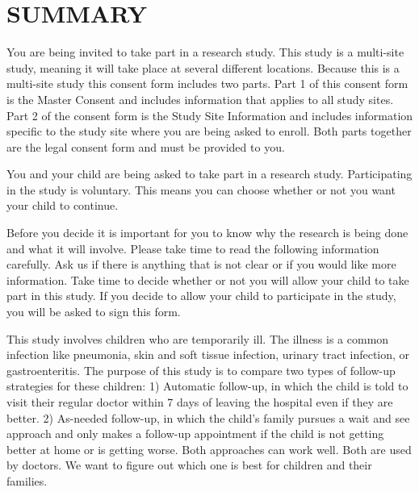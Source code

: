 \documentclass[11pt]{article}
\begin{document}
%
{%
}%
{}%

%
{%

}%
{}%

%
{%
}%
{}%

%
{%
\section{SUMMARY}
\label{sec:summary}
You are being invited to take part in a research study. This study is a multi-site study, meaning it will take place
at several different locations. Because this is a multi-site study this consent form includes two parts. Part 1 of
this consent form is the Master Consent and includes information that applies to all study sites. Part 2 of the
consent form is the Study Site Information and includes information specific to the study site where you are being
asked to enroll. Both parts together are the legal consent form and must be provided to you.

{You and your child are being asked to take part in a research study. Participating in the study is voluntary. This means you can choose whether or not you want your child to continue. 

Before you decide it is important for you to know why the research is being done and what it will involve. Please take time to read the following information carefully. Ask us if there is anything that is not clear or if you would like more information. 
Take time to decide whether or not you will allow your child to take part in this study. If you decide to allow your child to participate in the study, you will be asked to sign this form.

This study involves children who are temporarily ill. The illness is a common infection like pneumonia, skin and soft tissue infection, urinary tract infection, or gastroenteritis.  The purpose of this study is to compare two types of follow-up strategies for these children: 1) Automatic follow-up, in which the child is told to visit their regular doctor within 7 days of leaving the hospital even if they are better. 2) As-needed follow-up, in which the child's family pursues a wait and see approach and only makes a follow-up appointment if the child is not getting better at home or is getting worse. Both approaches can work well. Both are used by doctors.  We want to figure out which one is best for children and their families. 

}
}%
{}%
\end{document}
